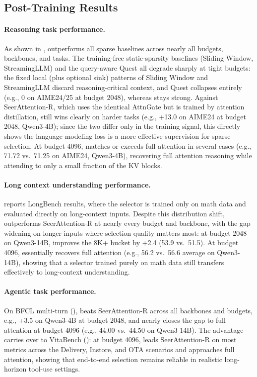 \subsection{Post-Training Results}
\label{sec:exp_posttrain}

\paragraph{Reasoning task performance.}
As shown in , \our{} outperforms all sparse baselines across nearly all budgets, backbones, and tasks.
The training-free static-sparsity baselines (Sliding Window, StreamingLLM) and the query-aware Quest all degrade sharply at tight budgets: the fixed local (plus optional sink) patterns of Sliding Window and StreamingLLM discard reasoning-critical context, and Quest collapses entirely (e.g., 0 on AIME24/25 at budget 2048), whereas \our{} stays strong.
Against SeerAttention-R, which uses the identical AttnGate but is trained by attention distillation, \our{} still wins clearly on harder tasks (e.g., +13.0 on AIME24 at budget 2048, Qwen3-4B); since the two differ only in the training signal, this directly shows the language modeling loss is a more effective supervision for sparse selection.
At budget 4096, \our{} matches or exceeds full attention in several cases (e.g., 71.72 vs.\ 71.25 on AIME24, Qwen3-4B), recovering full attention reasoning while attending to only a small fraction of the KV blocks.



\paragraph{Long context understanding performance.}
 reports LongBench results, where the selector is trained only on math data and evaluated directly on long-context inputs.
Despite this distribution shift, \our{} outperforms SeerAttention-R at nearly every budget and backbone, with the gap widening on longer inputs where selection quality matters most: at budget 2048 on Qwen3-14B, \our{} improves the 8K+ bucket by +2.4 (53.9 vs.\ 51.5).
At budget 4096, \our{} essentially recovers full attention (e.g., 56.2 vs.\ 56.6 average on Qwen3-14B), showing that a selector trained purely on math data still transfers effectively to long-context understanding.


\paragraph{Agentic task performance.}
On BFCL multi-turn (), \our{} beats SeerAttention-R across all backbones and budgets, e.g., +3.5 on Qwen3-4B at budget 2048, and nearly closes the gap to full attention at budget 4096 (e.g., 44.00 vs.\ 44.50 on Qwen3-14B).
The advantage carries over to VitaBench (): at budget 4096, \our{} leads SeerAttention-R on most metrics across the Delivery, Instore, and OTA scenarios and approaches full attention, showing that end-to-end selection remains reliable in realistic long-horizon tool-use settings.


